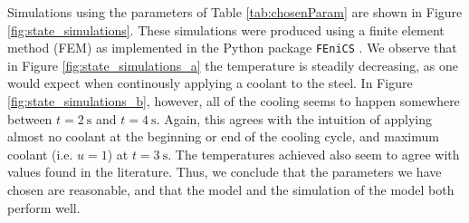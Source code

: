 Simulations using the parameters of Table \ref{tab:chosenParam} are shown in Figure \ref{fig:state_simulations}. These simulations were produced using a finite element method (FEM) as implemented in the Python package \verb|FEniCS| \cite{fenics}. We observe that in Figure \ref{fig:state_simulations_a} the temperature is steadily decreasing, as one would expect when continously applying a coolant to the steel. In Figure \ref{fig:state_simulations_b}, however, all of the cooling seems to happen somewhere between $t=\SI{2}{\second}$ and $t=\SI{4}{\second}$. Again, this agrees with the intuition of applying almost no coolant at the beginning or end of the cooling cycle, and maximum coolant (i.e. $u=1$) at $t=\SI{3}{\second}$. The temperatures achieved also seem to agree with values found in the literature. Thus, we conclude that the parameters we have chosen are reasonable, and that the model and the simulation of the model both perform well.
